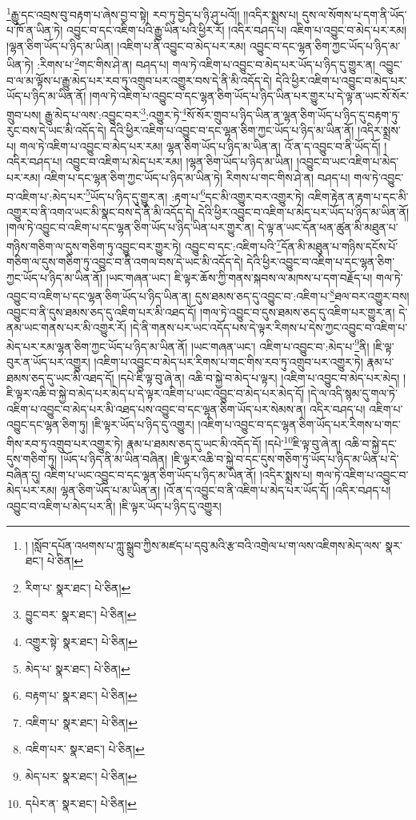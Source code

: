 \footnote{། །སློབ་དཔོན་འཕགས་པ་ཀླུ་སྒྲུབ་ཀྱིས་མཛད་པ་དབུ་མའི་རྩ་བའི་འགྲེལ་པ་ག་ལས་འཇིགས་མེད་ལས་  སྣར་ཐང་།  པེ་ཅིན། }རྒྱུ་དང་འབྲས་བུ་བརྟག་པ་ཞེས་བྱ་བ་སྟེ། རབ་ཏུ་བྱེད་པ་ཉི་ཤུ་པའོ།། །།འདིར་སྨྲས་པ། དུས་ལ་སོགས་པ་དག་ནི་ཡོད་པ་ཁོ་ན་ཡིན་ཏེ། འབྱུང་བ་དང་འཇིག་པའི་རྒྱུ་ཡིན་པའི་ཕྱིར་རོ། །འདིར་བཤད་པ། འཇིག་པ་འབྱུང་བ་མེད་པར་རམ། །ལྷན་ཅིག་ཡོད་པ་ཉིད་མ་ཡིན། །འཇིག་པ་ནི་འབྱུང་བ་མེད་པར་རམ། འབྱུང་བ་དང་ལྷན་ཅིག་ཀྱང་ཡོད་པ་ཉིད་མ་ཡིན་ཏེ། :རིགས་པ་\footnote{རིག་པ་  སྣར་ཐང་།  པེ་ཅིན། }གང་གིས་ཤེ་ན། བཤད་པ། གལ་ཏེ་འཇིག་པ་འབྱུང་བ་མེད་པར་ཡོད་པ་ཉིད་དུ་གྱུར་ན། འབྱུང་བ་ལ་མ་ལྟོས་པ་རྒྱུ་མེད་པར་རབ་ཏུ་འགྲུབ་པར་འགྱུར་བས་དེ་ནི་མི་འདོད་དེ། དེའི་ཕྱིར་འཇིག་པ་འབྱུང་བ་མེད་པར་ཡོད་པ་ཉིད་མ་ཡིན་ནོ། །གལ་ཏེ་འཇིག་པ་འབྱུང་བ་དང་ལྷན་ཅིག་ཡོད་པ་ཉིད་ཡིན་པར་གྱུར་པ་དེ་ལྟ་ན་ཡང་སོ་སོར་གྲུབ་པས། རྒྱུ་མེད་པ་ལས་:འབྱུང་བར་\footnote{བྱུང་བར་  སྣར་ཐང་།  པེ་ཅིན། }:འགྱུར་ཏེ་\footnote{འགྱུར་སྟེ་  སྣར་ཐང་།  པེ་ཅིན། }སོ་སོར་གྲུབ་པ་ཉིད་ཡིན་ན་ལྷན་ཅིག་ཡོད་པ་ཉིད་དུ་བརྟག་ཏུ་རུང་བས་དེ་ཡང་མི་འདོད་དེ། དེའི་ཕྱིར་འཇིག་པ་འབྱུང་བ་དང་ལྷན་ཅིག་ཀྱང་ཡོད་པ་ཉིད་མ་ཡིན་ནོ། །འདིར་སྨྲས་པ། གལ་ཏེ་འཇིག་པ་འབྱུང་བ་མེད་པར་རམ། ལྷན་ཅིག་ཡོད་པ་ཉིད་མ་ཡིན་ན། འོ་ན་ད་འབྱུང་བ་ནི་ཡོད་དོ། །འདིར་བཤད་པ། འབྱུང་བ་འཇིག་པ་མེད་པར་རམ། །ལྷན་ཅིག་ཡོད་པ་ཉིད་མ་ཡིན། །འབྱུང་བ་ཡང་འཇིག་པ་མེད་པར་རམ། འཇིག་པ་དང་ལྷན་ཅིག་ཀྱང་ཡོད་པ་ཉིད་མ་ཡིན་ཏེ། རིགས་པ་གང་གིས་ཤེ་ན། བཤད་པ། གལ་ཏེ་འབྱུང་བ་འཇིག་པ་:མེད་པར་\footnote{མེད་པ་  སྣར་ཐང་།  པེ་ཅིན། }ཡོད་པ་ཉིད་དུ་གྱུར་ན། :རྟག་པ་\footnote{བརྟག་པ་  སྣར་ཐང་།  པེ་ཅིན། }དང་མི་འགྱུར་བར་འགྱུར་ཏེ། འཇིག་རྟེན་ན་རྟག་པ་དང་མི་འགྱུར་བ་ནི་འགའ་ཡང་མི་སྣང་བས་དེ་ནི་མི་འདོད་དེ། དེའི་ཕྱིར་འབྱུང་བ་འཇིག་པ་མེད་པར་ཡོད་པ་ཉིད་མ་ཡིན་ནོ། །གལ་ཏེ་འབྱུང་བ་འཇིག་པ་དང་ལྷན་ཅིག་ཡོད་པ་ཉིད་ཡིན་པར་གྱུར་ན། དེ་ལྟ་ན་ཡང་དོན་ཕན་ཚུན་མི་མཐུན་པ་གཉིས་གཅིག་ལ་དུས་གཅིག་ཏུ་འབྱུང་བར་གྱུར་ཏེ། འབྱུང་བ་དང་:འཇིག་པའི་\footnote{འཇིག་པ་  སྣར་ཐང་།  པེ་ཅིན། }དོན་མི་མཐུན་པ་གཉིས་དངོས་པོ་གཅིག་ལ་དུས་གཅིག་ཏུ་འབྱུང་བ་ནི་འགལ་བས་དེ་ཡང་མི་འདོད་དེ། དེའི་ཕྱིར་འབྱུང་བ་འཇིག་པ་དང་ལྷན་ཅིག་ཀྱང་ཡོད་པ་ཉིད་མ་ཡིན་ནོ། །ཡང་གཞན་ཡང་། ཇི་ལྟར་ཆོས་ཀྱི་གནས་སྐབས་ལ་མཁས་པ་དག་བརྗོད་པ། གལ་ཏེ་འབྱུང་བ་འཇིག་པ་དང་ལྷན་ཅིག་ཡོད་པ་ཉིད་ཡིན་ན། དུས་ཐམས་ཅད་དུ་འབྱུང་བ་:འཇིག་པ་\footnote{འཇིག་པར་  སྣར་ཐང་།  པེ་ཅིན། }ཐལ་བར་འགྱུར་བས། འབྱུང་བ་ནི་དུས་ཐམས་ཅད་དུ་འཇིག་པར་མི་འཐད་དོ། །གལ་ཏེ་འབྱུང་བ་དུས་ཐམས་ཅད་དུ་འཇིག་པར་གྱུར་ན། དེ་ནམ་ཡང་གནས་པར་མི་འགྱུར་རོ། །དེ་ནི་གནས་པར་ཡང་འདོད་པས་དེ་ལྟར་རིགས་པ་དེས་ཀྱང་འབྱུང་བ་འཇིག་པ་མེད་པར་རམ་ལྷན་ཅིག་ཀྱང་ཡོད་པ་ཉིད་མ་ཡིན་ནོ། །ཡང་གཞན་ཡང་། འཇིག་པ་འབྱུང་བ་:མེད་པ་\footnote{མེད་པར་  སྣར་ཐང་།  པེ་ཅིན། }ནི། །ཇི་ལྟ་བུར་ན་ཡོད་པར་འགྱུར། །འཇིག་པ་འབྱུང་བ་མེད་པར་རིགས་པ་གང་གིས་རབ་ཏུ་འགྲུབ་པར་འགྱུར་ཏེ། རྣམ་པ་ཐམས་ཅད་དུ་ཡང་མི་འཐད་དོ། །དཔེ་ཇི་ལྟ་བུ་ཞེ་ན། འཆི་བ་སྐྱེ་བ་མེད་པ་ལྟར། །འཇིག་པ་འབྱུང་བ་མེད་པར་མེད། །ཇི་ལྟར་འཆི་བ་སྐྱེ་བ་མེད་པར་མེད་པ་དེ་ལྟར་འཇིག་པ་ཡང་འབྱུང་བ་མེད་པར་མེད་དོ། །དེ་ལ་འདི་སྙམ་དུ་གལ་ཏེ་འཇིག་པ་འབྱུང་བ་མེད་པར་མི་འཐད་པས་འབྱུང་བ་དང་ལྷན་ཅིག་ཡོད་པར་སེམས་ན། འདིར་བཤད་པ། འཇིག་པ་འབྱུང་དང་ལྷན་ཅིག་ཏུ། །ཇི་ལྟར་ཡོད་པ་ཉིད་དུ་འགྱུར། །འཇིག་པ་འབྱུང་བ་དང་ལྷན་ཅིག་ཡོད་པར་རིགས་པ་གང་གིས་རབ་ཏུ་འགྲུབ་པར་འགྱུར་ཏེ། རྣམ་པ་ཐམས་ཅད་དུ་ཡང་མི་འདོད་དོ། །དཔེ་\footnote{དཔེར་ན་  སྣར་ཐང་།  པེ་ཅིན། }ཇི་ལྟ་བུ་ཞེ་ན། འཆི་བ་སྐྱེ་དང་དུས་གཅིག་ཏུ། །ཡོད་པ་ཉིད་ནི་མ་ཡིན་བཞིན། །ཇི་ལྟར་འཆི་བ་སྐྱེ་བ་དང་དུས་གཅིག་ཏུ་ཡོད་པ་ཉིད་མ་ཡིན་པ་དེ་བཞིན་དུ། འཇིག་པ་ཡང་འབྱུང་བ་དང་ལྷན་ཅིག་ཡོད་པ་ཉིད་མ་ཡིན་ནོ། །འདིར་སྨྲས་པ། གལ་ཏེ་འཇིག་པ་འབྱུང་བ་མེད་པར་རམ། ལྷན་ཅིག་ཡོད་པ་མ་ཡིན་ན། །འོ་ན་ད་འབྱུང་བ་ནི་འཇིག་པ་མེད་པར་ཡོད་དོ། །འདིར་བཤད་པ། འབྱུང་བ་འཇིག་པ་མེད་པར་ནི། །ཇི་ལྟར་ཡོད་པ་ཉིད་དུ་འགྱུར། 